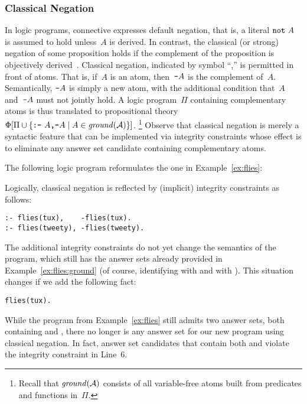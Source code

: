 \subsubsection{Classical Negation}\label{subsec:gringo:negation}

In logic programs, connective  expresses default negation,
that is, a literal $\texttt{not}~A$ is assumed to hold unless~$A$ is derived.
In contrast, the classical (or strong) negation of some proposition
holds if the complement of the proposition is objectively derived~\cite{gellif91a}.
Classical negation, indicated by symbol ``\code{-},'' is permitted in front of atoms.
That is, if~$A$ is an atom, then~$\texttt{-}A$ is the complement of~$A$.
Semantically, $\texttt{-}A$ is simply a new atom,
with the additional condition that~$A$ and~$\texttt{-}A$ must not jointly hold.
A logic program~$\Pi$ containing complementary atoms is thus translated
to propositional theory
$\Phi[\Pi \cup \{\texttt{:-}~A\texttt{,}\texttt{-}A \mid A\in\mathit{ground}(\mathcal{A})\}]$.%
\footnote{Recall that $\mathit{ground}(\mathcal{A})$ consists of all variable-free atoms
built from predicates and functions in~$\Pi$.}
Observe that classical negation is merely a syntactic feature that can be
implemented via integrity constraints whose effect is to eliminate
any answer set candidate containing complementary atoms.

\begin{example}\label{ex:flies:neg}
The following logic program reformulates the one in Example~\ref{ex:flies}:
%


%
Logically, classical negation is reflected by
(implicit) integrity constraints as follows:%
%
\begin{lstlisting}[firstnumber=6]
:- flies(tux),    -flies(tux).
:- flies(tweety), -flies(tweety).
\end{lstlisting}
The additional integrity constraints do not yet change the semantics of the
program, which still has the answer sets already provided in Example~\ref{ex:flies:ground}
(of course, identifying
 with
 and
 with
).
This situation changes if we add the following fact:
\begin{lstlisting}[firstnumber=8]
flies(tux).
\end{lstlisting}
While the program from Example~\ref{ex:flies} still admits two answer sets,
both containing 
 and
,
there no longer is any answer set for our new program using classical negation.
In fact, answer set candidates that contain both
 and
 violate the integrity constraint in Line~6.
\eexample
\end{example}


